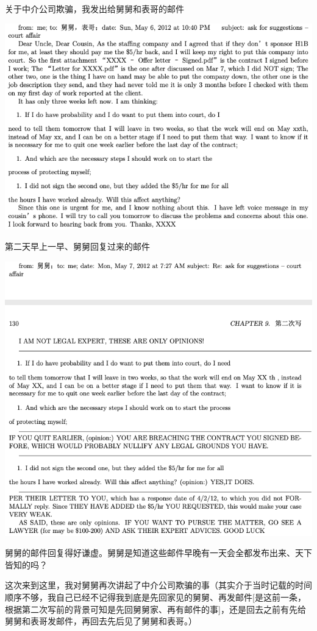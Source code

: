 \documentclass[9pt, b5paper]{article}
\begin{document}
关于中介公司欺骗，我发出给舅舅和表哥的邮件

\begin{center}
\includegraphics[width=.9\linewidth]{./pic/p1p129.png}
\end{center}

第二天早上一早、舅舅回复过来的邮件

\begin{center}
\includegraphics[width=.9\linewidth]{./pic/p1p130.png}
\end{center}

舅舅的邮件回复得好谦虚。舅舅是知道这些邮件早晚有一天会全都发布出来、天下皆知的吗？

这次来到这里，我对舅舅再次讲起了中介公司欺骗的事（其实介于当时记载的时间顺序不够，我自己已经不记得我到底是先回家见的舅舅、再发邮件[是这前一条，根据第二次写前的背景可知是先回舅舅家、再有邮件的事]，还是回去之前有先给舅舅和表哥发邮件，再回去先后见了舅舅和表哥。）
\end{document}
